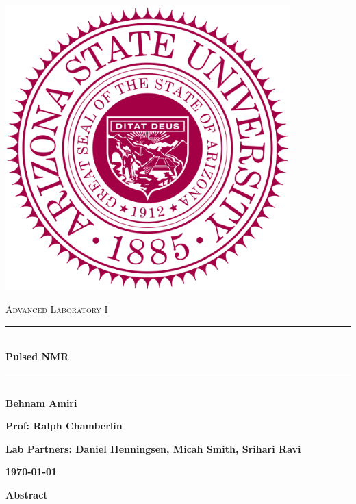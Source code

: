 \documentclass[fleqn]{article}
\begin{document}
  \begin{titlepage}

    \newcommand{\HRule}{\rule{\linewidth}{0.5mm}}

    \center

    \begin{center}
      \includegraphics[height=11cm, width=11cm]{asu.png}
    \end{center}

    \vline

    \textsc{\LARGE Advanced Laboratory I}\\[1.5cm]

    \HRule \\[0.5cm]
    { \huge \bfseries Pulsed NMR}\\[0.4cm] 
    \HRule \\[1.0cm]

    \textbf{Behnam Amiri}

    \bigbreak

    \textbf{Prof: Ralph Chamberlin}

    \bigbreak

    \textbf{Lab Partners: Daniel Henningsen, Micah Smith, Srihari Ravi}

    \bigbreak

    \textbf{{\large \today}\\[2cm]}

    \vfill

  \end{titlepage}

  \textbf{Abstract}
\end{document}
